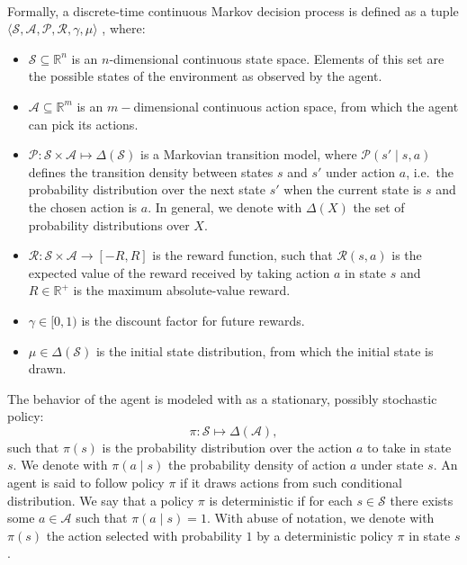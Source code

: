 \paragraph{} %
Formally, a discrete-time continuous Markov decision process is defined as a tuple
$\langle \mathcal{S},\mathcal{A},\mathcal{P},\mathcal{R},\gamma,\mu \rangle$
, where:
\begin{itemize}
\item $\mathcal{S} \subseteq \mathbb{R}^n$ is an $n$-dimensional continuous state space. Elements of this set are the possible states of the environment as observed by the agent.
\item $\mathcal{A}\subseteq \mathbb{R}^m$ is an $m-$dimensional continuous action space, from which the agent can pick its actions.
\item  $\mathcal{P} \colon \mathcal{S}\times\mathcal{A} \mapsto \Delta(\mathcal{S}) $ is a Markovian transition model, where $\mathcal{P}(s'\mid s,a)$ defines the transition density between states $s$ and $s'$ under action $a$, i.e.\ the probability distribution over the next state $s'$ when the current state is $s$ and the chosen action is $a$. In general, we denote with $\Delta(X)$ the set of probability distributions over $X$.
\item $\mathcal{R}:\mathcal{S} \times \mathcal{A} \rightarrow [-R,R]$ is the reward function, such that $\mathcal{R}(s,a)$ is the expected value of the reward received by taking action $a$ in state $s$ and $R \in \mathbb{R^+}$ is the maximum absolute-value reward.
\item $\gamma \in [0,1)$ is the discount factor for future rewards.
\item $\mu \in \Delta(\mathcal{S})$ is the initial state distribution, from which the initial state is drawn.
\end{itemize}
The behavior of the agent is modeled with as a stationary, possibly stochastic policy:
 \[
 	\pi \colon \mathcal{S}\mapsto\Delta(\mathcal{A}),
 \] 
such that $\pi(s)$ is the probability distribution over the action $a$ to take in state $s$. We denote with $\pi(a \mid s)$ the probability density of action $a$ under state $s$. An agent is said to follow policy $\pi$ if it draws actions from such conditional distribution. 
We say that a policy $\pi$ is deterministic if for each $s \in \mathcal{S}$ there exists some $a \in \mathcal{A}$ such that $\pi(a \mid s) = 1$. With abuse of notation, we denote with $\pi(s)$ the action selected with probability $1$ by a deterministic policy $\pi$ in state $s$.

